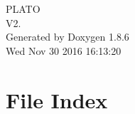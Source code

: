 \documentclass[twoside]{book}
\newcommand{\clearemptydoublepage}{%
  \newpage{\pagestyle{empty}\cleardoublepage}%
}
\begin{document}
\hypersetup{pageanchor=false}
\begin{titlepage}
\vspace*{7cm}
\begin{center}%
{\Large P\-L\-A\-T\-O \\[1ex]\large V2. }\\
\vspace*{1cm}
{\large Generated by Doxygen 1.8.6}\\
\vspace*{0.5cm}
{\small Wed Nov 30 2016 16:13:20}\\
\end{center}
\end{titlepage}
\clearemptydoublepage
\tableofcontents
\clearemptydoublepage
{}
\hypersetup{pageanchor=true}

\chapter{File Index}

\end{document}
